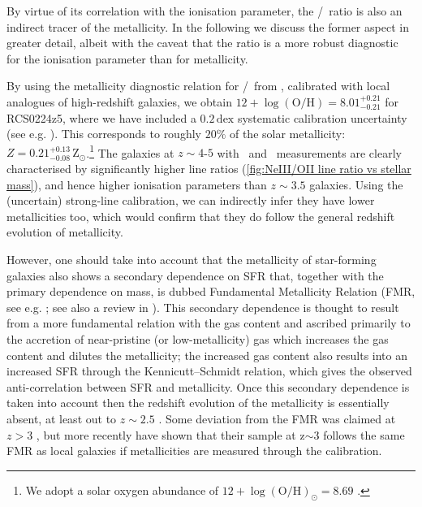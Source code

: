 By virtue of its correlation with the ionisation parameter, the \NeIII/\OII\ ratio is also an indirect tracer of the metallicity. In the following we discuss the former aspect in greater detail, albeit with the caveat that the ratio is a more robust diagnostic for the ionisation parameter than for metallicity.

By using the metallicity diagnostic relation for \NeIII/\OII\ from \citet{2018ApJ...859..175B}, calibrated with local analogues of high-redshift galaxies, we obtain $12 + \log \left ( \text{O/H} \right) = 8.01_{-0.21}^{+0.21}$ for RCS0224z5, where we have included a $0.2 \, \mathrm{dex}$ systematic calibration uncertainty (see e.g. \citealt{2006A&A...459...85N}). This corresponds to roughly $20\%$ of the solar metallicity: $Z = 0.21_{-0.08}^{+0.13} \, \mathrm{Z_\odot}$.\footnote{We adopt a solar oxygen abundance of $12 + \log \left ( \text{O/H} \right)_\odot = 8.69$ \citep{2009ARA&A..47..481A}.} The galaxies at $z \sim 4$-$5$ with \NeIII\ and \OII\ measurements are clearly characterised by significantly higher line ratios (\cref{fig:NeIII/OII line ratio vs stellar mass}), and hence higher ionisation parameters than $z \sim 3.5$ galaxies. Using the (uncertain) strong-line calibration, we can indirectly infer they have lower metallicities too, which would confirm that they do follow the general redshift evolution of metallicity.

However, one should take into account that the metallicity of star-forming galaxies also shows a secondary dependence on SFR that, together with the primary dependence on mass, is dubbed Fundamental Metallicity Relation (FMR, see e.g. \citealt{2010MNRAS.408.2115M}; see also a review in \citealt{2019A&ARv..27....3M}). This secondary dependence is thought to result from a more fundamental relation with the gas content \citep{2013MNRAS.433.1425B, 2016MNRAS.455.1156B, 2016A&A...595A..48B} and ascribed primarily to the accretion of near-pristine (or low-metallicity) gas which increases the gas content and dilutes the metallicity; the increased gas content also results into an increased SFR through the Kennicutt–Schmidt relation, which gives the observed anti-correlation between SFR and metallicity. Once this secondary dependence is taken into account then the redshift evolution of the metallicity is essentially absent, at least out to $z \sim 2.5$ \citep{2010MNRAS.408.2115M, 2019A&A...627A..42C}. Some deviation from the FMR was claimed at $z > 3$ \citep{2014A&A...563A..58T}, but more recently \cite{2021ApJ...914...19S} have shown that their sample at z$\sim$3 follows the same FMR as local galaxies if metallicities are measured through the \citet{2018ApJ...859..175B} calibration.

